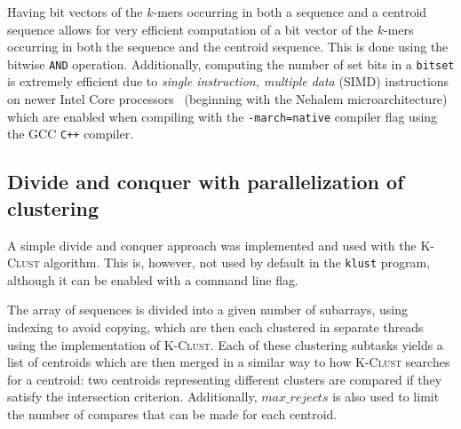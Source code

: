 Having bit vectors of the $k$-mers occurring in both a sequence and a centroid
sequence allows for very efficient computation of a bit vector of the $k$-mers
occurring in both the sequence and the centroid sequence. This is done using
the bitwise \verb|AND| operation. Additionally, computing the number of set
bits in a \verb|bitset| is extremely efficient due to \emph{single instruction,
multiple data} (SIMD) instructions on newer Intel Core processors~\cite{intel}
(beginning with the Nehalem microarchitecture) which are enabled when compiling
with the \verb|-march=native| compiler flag using the GCC \texttt{C++}
compiler.


\subsection{Divide and conquer with parallelization of clustering}

A simple divide and conquer approach was implemented and used with the
\textsc{K-Clust} algorithm. This is, however, not used by default in the
\texttt{klust} program, although it can be enabled with a command line flag.

The array of sequences is divided into a given number of subarrays, using
indexing to avoid copying, which are then each clustered in separate threads
using the implementation of \textsc{K-Clust}.  Each of these clustering
subtasks yields a list of centroids which are then merged in a similar way to
how \textsc{K-Clust} searches for a centroid: two centroids representing
different clusters are compared if they satisfy the intersection criterion.
Additionally, $max\_rejects$ is also used to limit the number of compares that
can be made for each centroid.
